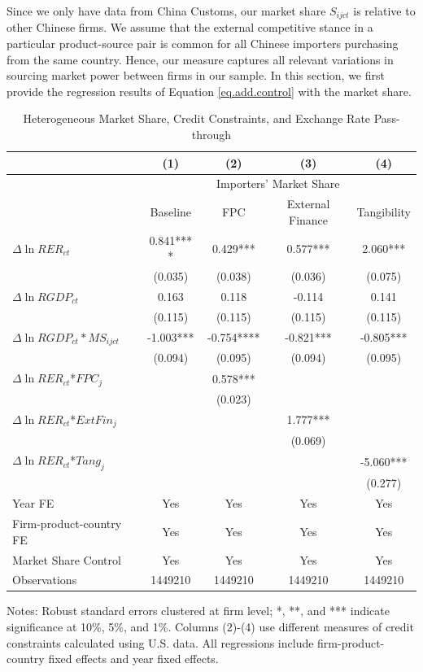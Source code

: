 \documentclass[12pt]{article}
\begin{document}
Since we only have data from China Customs, our market share $S_{ijct}$ is relative to other Chinese firms. We assume that the external competitive stance in a particular product-source pair is common for all Chinese importers purchasing from the same country. Hence, our measure captures all relevant variations in sourcing market power between firms in our sample. In this section, we first provide the regression results of Equation \ref{eq.add.control} with the market share. 

\begin{table}[htbp]
	\centering
	\caption{Heterogeneous Market Share, Credit Constraints, and Exchange Rate Pass-through}
	\begin{threeparttable}
		\begin{tabular}{lcccc}
			\toprule
			& (1)   & (2)   & (3)   & (4) \\
			\midrule
			& \multicolumn{4}{c}{Importers' Market Share}  \\
			&  Baseline     & FPC & External Finance& Tangibility        \\
			\midrule
			$\Delta \ln RER_{ct}$ & 0.841*** * & 0.429*** & 0.577*** & 2.060*** \\
			& (0.035) & (0.038) & (0.036) & (0.075) \\
			$\Delta \ln RGDP_{ct}$ & 0.163 & 0.118 & -0.114 & 0.141\\
			& (0.115) & (0.115) & (0.115) & (0.115) \\
			$\Delta \ln RGDP_{ct}*MS_{ijct}$ & -1.003***  & -0.754**** & -0.821*** & -0.805*** \\
			& (0.094) & (0.095) & (0.094) & (0.095) \\
			$\Delta \ln RER_{ct}$*$FPC_{j}$ &   & 0.578*** &       &  \\
			&       & (0.023) &       &  \\
			$\Delta \ln RER_{ct}$*$ExtFin_{j}$ &       &       & 1.777*** &  \\
			&      &       & (0.069) &  \\
			$\Delta \ln RER_{ct}$*$Tang_{j}$ &       &       &       & -5.060*** \\
			&       &       &       & (0.277) \\
			Year FE  & Yes  & Yes   & Yes   & Yes \\
			Firm-product-country FE & Yes    & Yes   & Yes   & Yes \\
			Market Share Control & Yes   & Yes   & Yes   & Yes \\
			Observations & 1449210  & 1449210 & 1449210 & 1449210 \\
			\bottomrule
		\end{tabular}
		\begin{tablenotes}
			\footnotesize
			\item[Notes:] Robust standard errors clustered at firm level; *, **, and *** indicate significance at 10\%, 5\%, and 1\%. Columns (2)-(4) use different measures of credit constraints calculated using U.S. data. All regressions include firm-product-country fixed effects and year fixed effects.
		\end{tablenotes}
	\end{threeparttable}
	\label{tab.share}
\end{table}
\end{document}
